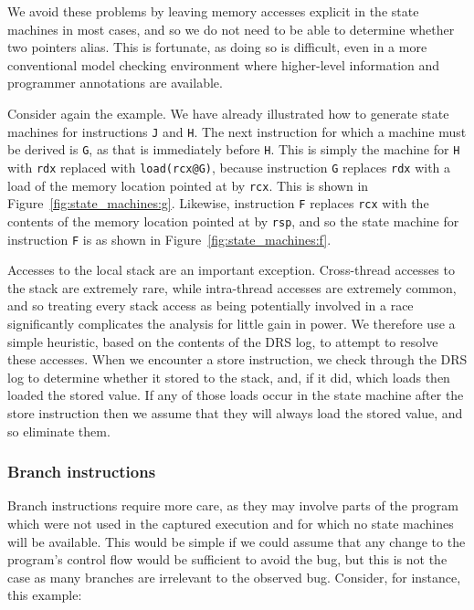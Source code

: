 \documentclass[10pt,letter,twocolumn]{sigplanconf}
\newcommand{\editorial}[1]{}
\newcommand{\needCite}{\editorial{need cite}}
\begin{document}
We avoid these problems by leaving memory accesses explicit in the
state machines in most cases, and so we do not need to be able to
determine whether two pointers alias.  This is fortunate, as doing so
is difficult, even in a more conventional model checking environment
where higher-level information and programmer annotations are
available\needCite{}.

Consider again the example.  We have already illustrated how to
generate state machines for instructions \verb|J| and \verb|H|.  The
next instruction for which a machine must be derived is \verb|G|, as
that is immediately before \verb|H|.  This is simply the machine for
\verb|H| with \verb|rdx| replaced with \verb|load(rcx@G)|, because
instruction \verb|G| replaces \verb|rdx| with a load of the memory
location pointed at by \verb|rcx|.  This is shown in
Figure~\ref{fig:state_machines:g}.  Likewise, instruction \verb|F|
replaces \verb|rcx| with the contents of the memory location pointed
at by \verb|rsp|, and so the state machine for instruction \verb|F| is
as shown in Figure~\ref{fig:state_machines:f}.

Accesses to the local stack are an important exception.  Cross-thread
accesses to the stack are extremely rare, while intra-thread accesses
are extremely common, and so treating every stack access as being
potentially involved in a race significantly complicates the analysis
for little gain in power.  We therefore use a simple heuristic, based
on the contents of the DRS log, to attempt to resolve these accesses.
When we encounter a store instruction, we check through the DRS log to
determine whether it stored to the stack, and, if it did, which loads
then loaded the stored value.  If any of those loads occur in the
state machine after the store instruction then we assume that they
will always load the stored value, and so eliminate them.

\subsubsection{Branch instructions}
\label{sect:branch_instrs}
Branch instructions require more care, as they may involve parts of
the program which were not used in the captured execution and for
which no state machines will be available.  This would be simple if we
could assume that any change to the program's control flow would be
sufficient to avoid the bug, but this is not the case as many branches
are irrelevant to the observed bug.  Consider, for instance, this
example:
\end{document}
